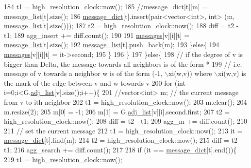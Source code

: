 \begin{DoxyCode}
184             t1 = high\_resolution\_clock::now();
185             \textcolor{comment}{//message\_dict[t][m] = message\_list[t].size();}
186             \hyperlink{classgraph__message_ab54d89b122c2b1322da0d5db2043fb84}{message\_dict}[t].insert(pair<vector<int>, \textcolor{keywordtype}{int}> (m, 
      \hyperlink{classgraph__message_aa17fdb629b423343edfafa97252763ef}{message\_list}[t].size()));
187             t2 = high\_resolution\_clock::now();
188             diff = t2 - t1;
189             agg\_insert += diff.count();
190 
191             \hyperlink{classgraph__message_aac77e098f0acf9650116a8e51fe3b4b7}{messages}[v][i][t] = \hyperlink{classgraph__message_aa17fdb629b423343edfafa97252763ef}{message\_list}[t].size();
192             \hyperlink{classgraph__message_aa17fdb629b423343edfafa97252763ef}{message\_list}[t].push\_back(m);
193           \}\textcolor{keywordflow}{else}\{
194             \hyperlink{classgraph__message_aac77e098f0acf9650116a8e51fe3b4b7}{messages}[v][i][t] = it->second;
195           \}
196         \}
197       \}\textcolor{keywordflow}{else}\{
198         \textcolor{comment}{// if the degree of v is bigger than Delta, the message towards all neighbors is of the form *}
199         \textcolor{comment}{// i.e. message of v towards a neighbor w is of the form (-1, \(\backslash\)xi(w,v)) where \(\backslash\)xi(w,v) is the mark
       of the edge between v and w towards v}
200         \textcolor{keywordflow}{for} (\textcolor{keywordtype}{int} i=0;i<G.\hyperlink{classmarked__graph_a1a0bf7ca413a278763f7c878b3b6fd6f}{adj\_list}[v].size();i++)\{
201           \textcolor{comment}{//vector<int> m; // the current message from v to ith neighbor}
202           t1 = high\_resolution\_clock::now();
203           m.clear();
204           m.resize(2);
205           m[0] = -1;
206           m[1] = G.\hyperlink{classmarked__graph_a1a0bf7ca413a278763f7c878b3b6fd6f}{adj\_list}[v][i].second.first;
207           t2 = high\_resolution\_clock::now();
208           diff = t2 - t1;
209           agg\_m += diff.count();
210 
211           \textcolor{comment}{// set the current message}
212           t1 = high\_resolution\_clock::now();
213           it = \hyperlink{classgraph__message_ab54d89b122c2b1322da0d5db2043fb84}{message\_dict}[t].find(m);
214           t2 = high\_resolution\_clock::now();
215           diff = t2 - t1;
216           agg\_search += diff.count();
217 
218           \textcolor{keywordflow}{if} (it == \hyperlink{classgraph__message_ab54d89b122c2b1322da0d5db2043fb84}{message\_dict}[t].end())\{
219             t1 = high\_resolution\_clock::now();

\end{DoxyCode}
